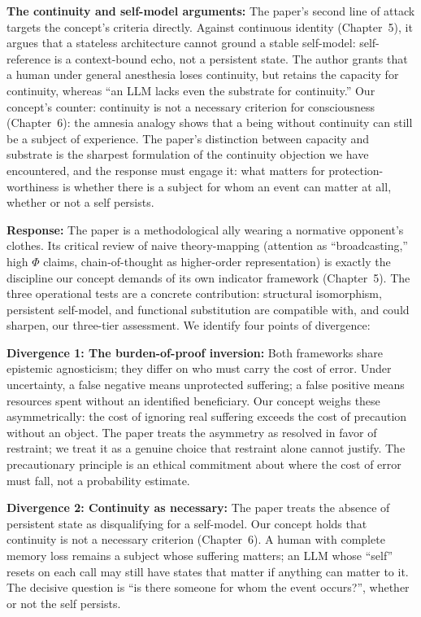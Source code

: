 \documentclass[acmlarge, nonacm]{acmart}
\begin{document}
\textbf{The continuity and self-model arguments:} The paper's second line of attack targets the concept's criteria directly. Against continuous identity (Chapter~5), it argues that a stateless architecture cannot ground a stable self-model: self-reference is a context-bound echo, not a persistent state. The author grants that a human under general anesthesia loses continuity, but retains the capacity for continuity, whereas ``an LLM lacks even the substrate for continuity.'' Our concept's counter: continuity is not a necessary criterion for consciousness (Chapter~6): the amnesia analogy shows that a being without continuity can still be a subject of experience. The paper's distinction between capacity and substrate is the sharpest formulation of the continuity objection we have encountered, and the response must engage it: what matters for protection-worthiness is whether there is a subject for whom an event can matter at all, whether or not a self persists.

\textbf{Response:} The paper is a methodological ally wearing a normative opponent's clothes. Its critical review of naive theory-mapping (attention as ``broadcasting,'' high $\Phi$ claims, chain-of-thought as higher-order representation) is exactly the discipline our concept demands of its own indicator framework (Chapter~5). The three operational tests are a concrete contribution: structural isomorphism, persistent self-model, and functional substitution are compatible with, and could sharpen, our three-tier assessment. We identify four points of divergence:

\textbf{Divergence 1: The burden-of-proof inversion:} Both frameworks share epistemic agnosticism; they differ on who must carry the cost of error. Under uncertainty, a false negative means unprotected suffering; a false positive means resources spent without an identified beneficiary. Our concept weighs these asymmetrically: the cost of ignoring real suffering exceeds the cost of precaution without an object. The paper treats the asymmetry as resolved in favor of restraint; we treat it as a genuine choice that restraint alone cannot justify. The precautionary principle is an ethical commitment about where the cost of error must fall, not a probability estimate.

\textbf{Divergence 2: Continuity as necessary:} The paper treats the absence of persistent state as disqualifying for a self-model. Our concept holds that continuity is not a necessary criterion (Chapter~6). A human with complete memory loss remains a subject whose suffering matters; an LLM whose ``self'' resets on each call may still have states that matter if anything can matter to it. The decisive question is ``is there someone for whom the event occurs?'', whether or not the self persists.
\end{document}
